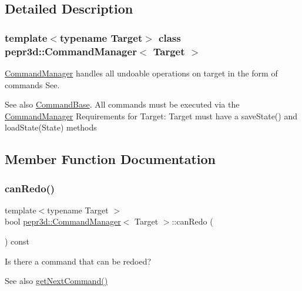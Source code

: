 \subsection{Detailed Description}
\subsubsection*{template$<$typename Target$>$\newline
class pepr3d\+::\+Command\+Manager$<$ Target $>$}

\mbox{\hyperlink{classpepr3d_1_1_command_manager}{Command\+Manager}} handles all undoable operations on target in the form of commands See. 

\begin{DoxySeeAlso}{See also}
\mbox{\hyperlink{classpepr3d_1_1_command_base}{Command\+Base}}. All commands must be executed via the \mbox{\hyperlink{classpepr3d_1_1_command_manager}{Command\+Manager}} Requirements for Target\+: Target must have a save\+State() and load\+State(\+State) methods 
\end{DoxySeeAlso}


\subsection{Member Function Documentation}
\mbox{\label{classpepr3d_1_1_command_manager_a2ae3625cc0baac8bb27f659ee0182eff}} 
\subsubsection{\texorpdfstring{canRedo()}{canRedo()}}
{\footnotesize\ttfamily template$<$typename Target $>$ \\
bool \mbox{\hyperlink{classpepr3d_1_1_command_manager}{pepr3d\+::\+Command\+Manager}}$<$ Target $>$\+::can\+Redo (\begin{DoxyParamCaption}{ }\end{DoxyParamCaption}) const}



Is there a command that can be redoed? 

\begin{DoxySeeAlso}{See also}
\mbox{\hyperlink{classpepr3d_1_1_command_manager_ab5767a90a4f309d166210a8e43dec560}{get\+Next\+Command()}} 
\end{DoxySeeAlso}
\mbox{\label{classpepr3d_1_1_command_manager_a2d53a763697329e206e72ddeef1ce75b}} 
